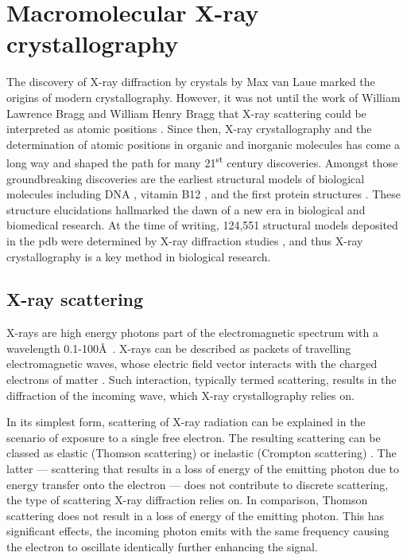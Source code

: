 
%
%

\section{Macromolecular X-ray crystallography}
The discovery of X-ray diffraction by crystals by Max van Laue \cite{Friedrich1913-vx,Laue1913-sn} marked the origins of modern crystallography. However, it was not until the work of William Lawrence Bragg and William Henry Bragg that X-ray scattering could be interpreted as atomic positions \cite{Bragg1913-cx,Bragg1929-xp,Bragg1912-ht}. Since then, X-ray crystallography and the determination of atomic positions in organic and inorganic molecules has come a long way and shaped the path for many 21\textsuperscript{st} century discoveries. Amongst those groundbreaking discoveries are the earliest structural models of biological molecules including DNA \cite{Watson1953-qw}, vitamin B12 \cite{Hodgkin1956-mx}, and the first protein structures \cite{Blundell1971-mv,Blake1965-ng,Perutz1960-qz,Kendrew1958-on}. These structure elucidations hallmarked the dawn of a new era in biological and biomedical research. At the time of writing, 124,551 structural models deposited in the \gls{pdb} were determined by X-ray diffraction studies \cite{Berman2000-ua}, and thus X-ray crystallography is a key method in biological research.

\subsection{X-ray scattering}
X-rays are high energy photons part of the electromagnetic spectrum with a wavelength 0.1-100\AA\ \cite{Rupp2010-nc}. X-rays can be described as packets of travelling electromagnetic waves, whose electric field vector interacts with the charged electrons of matter \cite{Rupp2010-nc}. Such interaction, typically termed scattering, results in the diffraction of the incoming wave, which X-ray crystallography relies on.

In its simplest form, scattering of X-ray radiation can be explained in the scenario of exposure to a single free electron. The resulting scattering can be classed as elastic (Thomson scattering) or inelastic (Crompton scattering) \cite{Rupp2010-nc}. The latter --- scattering that results in a loss of energy of the emitting photon due to energy transfer onto the electron --- does not contribute to discrete scattering, the type of scattering X-ray diffraction relies on. In comparison, Thomson scattering does not result in a loss of energy of the emitting photon. This has significant effects, the incoming photon emits with the same frequency causing the electron to oscillate identically further enhancing the signal.

